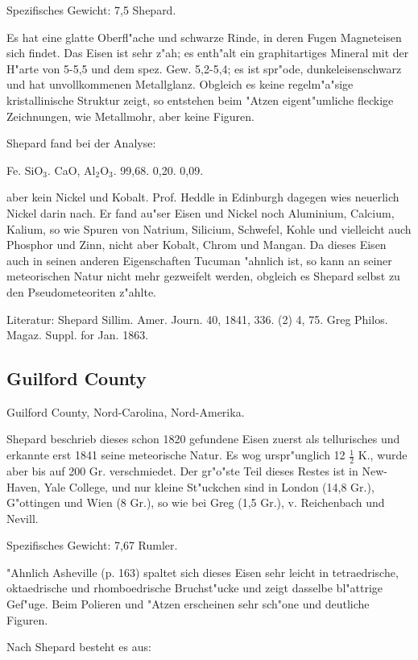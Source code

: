 \documentclass[a4paper, 11pt, oneside]{article}
\begin{document}
Spezifisches Gewicht: 7,5 Shepard.

Es hat eine glatte Oberfl"ache und schwarze Rinde, in deren Fugen Magneteisen sich findet. Das Eisen ist sehr z"ah; es enth"alt ein graphitartiges Mineral mit der H"arte von 5-5,5 und dem spez. Gew. 5,2-5,4; es ist spr"ode, dunkeleisenschwarz und hat unvollkommenen Metallglanz. Obgleich es keine regelm"a"sige kristallinische Struktur zeigt, so entstehen beim "Atzen eigent"umliche fleckige Zeichnungen, wie Metallmohr, aber keine Figuren.

Shepard fand bei der Analyse:

Fe. SiO$_{3}$. CaO, Al$_{2}$O$_{3}$.  
99,68. 0,20. 0,09.

aber kein Nickel und Kobalt. Prof. Heddle in Edinburgh dagegen wies neuerlich Nickel darin nach. Er fand au"ser Eisen und Nickel noch Aluminium, Calcium, Kalium, so wie Spuren von Natrium, Silicium, Schwefel, Kohle und vielleicht auch Phosphor und Zinn, nicht aber Kobalt, Chrom und Mangan. Da dieses Eisen auch in seinen anderen Eigenschaften Tucuman "ahnlich ist, so kann an seiner meteorischen Natur nicht mehr gezweifelt werden, obgleich es Shepard selbst zu den Pseudometeoriten z"ahlte.

Literatur: Shepard Sillim. Amer. Journ. 40, 1841, 336. (2) 4, 75. Greg Philos. Magaz. Suppl. for Jan. 1863.

\subsection{Guilford County}

Guilford County, Nord-Carolina, Nord-Amerika.

Shepard beschrieb dieses schon 1820 gefundene Eisen zuerst als tellurisches und erkannte erst 1841 seine meteorische Natur. Es wog urspr"unglich 12 $\frac{1}{2}$ K., wurde aber bis auf 200 Gr. verschmiedet. Der gr"o"ste Teil dieses Restes ist in New-Haven, Yale College, und nur kleine St"uckchen sind in London (14,8 Gr.), G"ottingen und Wien (8 Gr.), so wie bei Greg (1,5 Gr.), v. Reichenbach und Nevill.

Spezifisches Gewicht: 7,67 Rumler.

"Ahnlich Asheville (p. 163) spaltet sich dieses Eisen sehr leicht in tetraedrische, oktaedrische und rhomboedrische Bruchst"ucke und zeigt dasselbe bl"attrige Gef"uge. Beim Polieren und "Atzen erscheinen sehr sch"one und deutliche Figuren.

Nach Shepard besteht es aus:
\end{document}
